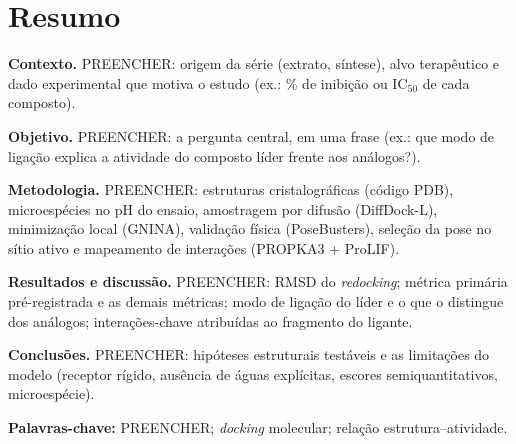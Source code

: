 \section*{Resumo}

\textbf{Contexto.} PREENCHER: origem da série (extrato, síntese), alvo terapêutico e dado experimental que motiva o estudo (ex.: \% de inibição ou $\text{IC}_{50}$ de cada composto).

\textbf{Objetivo.} PREENCHER: a pergunta central, em uma frase (ex.: que modo de ligação explica a atividade do composto líder frente aos análogos?).

\textbf{Metodologia.} PREENCHER: estruturas cristalográficas (código PDB), microespécies no pH do ensaio, amostragem por difusão (DiffDock-L), minimização local (GNINA), validação física (PoseBusters), seleção da pose no sítio ativo e mapeamento de interações (PROPKA3 + ProLIF).

\textbf{Resultados e discussão.} PREENCHER: RMSD do \textit{redocking}; métrica primária pré-registrada e as demais métricas; modo de ligação do líder e o que o distingue dos análogos; interações-chave atribuídas ao fragmento do ligante.

\textbf{Conclusões.} PREENCHER: hipóteses estruturais testáveis e as limitações do modelo (receptor rígido, ausência de águas explícitas, escores semiquantitativos, microespécie).

\vspace{6pt}
\textbf{Palavras-chave:} PREENCHER; \textit{docking} molecular; relação estrutura--atividade.

